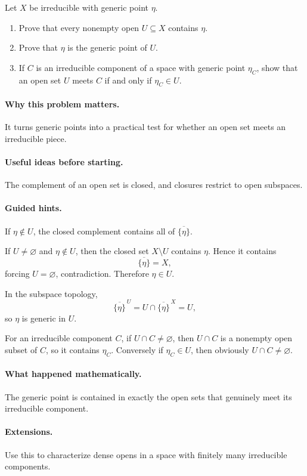 \begin{problem}
Let $X$ be irreducible with generic point $\eta$.
\begin{enumerate}
\item Prove that every nonempty open $U\subseteq X$ contains $\eta$.
\item Prove that $\eta$ is the generic point of $U$.
\item If $C$ is an irreducible component of a space with generic point $\eta_C$, show that
an open set $U$ meets $C$ if and only if $\eta_C\in U$.
\end{enumerate}
\end{problem}

\paragraph{Why this problem matters.}
It turns generic points into a practical test for whether an open set meets an irreducible
piece.

\paragraph{Useful ideas before starting.}
The complement of an open set is closed, and closures restrict to open subspaces.

\paragraph{Guided hints.}
If $\eta\notin U$, the closed complement contains all of $\overline{\{\eta\}}$.

\begin{solution}
If $U\neq\varnothing$ and $\eta\notin U$, then the closed set $X\setminus U$ contains
$\eta$.  Hence it contains
\[
\overline{\{\eta\}}=X,
\]
forcing $U=\varnothing$, contradiction.  Therefore $\eta\in U$.

In the subspace topology,
\[
\overline{\{\eta\}}^{\,U}
=
U\cap\overline{\{\eta\}}^{\,X}
=
U,
\]
so $\eta$ is generic in $U$.

For an irreducible component $C$, if $U\cap C\neq\varnothing$, then $U\cap C$ is a
nonempty open subset of $C$, so it contains $\eta_C$.  Conversely if $\eta_C\in U$, then
obviously $U\cap C\neq\varnothing$.
\end{solution}

\paragraph{What happened mathematically.}
The generic point is contained in exactly the open sets that genuinely meet its irreducible
component.

\paragraph{Extensions.}
Use this to characterize dense opens in a space with finitely many irreducible components.
